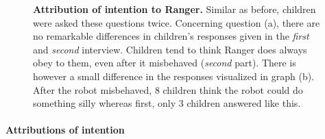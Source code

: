 \documentclass{sig-alternate}
\begin{document}
\begin{figure}[h]
    \centering
    \caption[Attribution of Intention to Ranger]{\small \textbf{Attribution of
    intention to Ranger.} Similar as before, children were asked these questions
    twice. Concerning question (a), there are no remarkable differences in
    children's responses given in the \textit{first} and \textit{second} interview.
    Children tend to think Ranger does always obey to them, even after it misbehaved
    (\textit{second} part). There is however a small difference in the responses
    visualized in graph (b). After the robot misbehaved, 8 children think the robot
    could do something silly whereas first, only 3 children answered like this.}
    
    \label{fig:domino-intention}
\end{figure}		

\paragraph{Attributions of intention}
\end{document}
